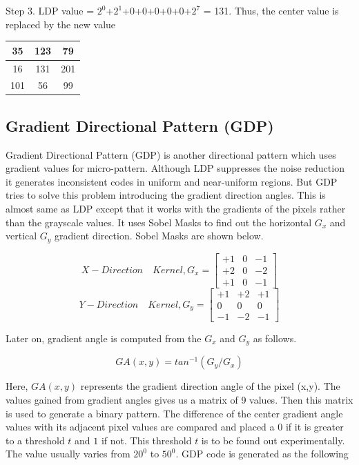 \documentclass[conference]{IEEEtran}
\begin{document}
Step 3. LDP value = $2^0$+$2^1$+0+0+0+0+0+$2^7$ = 131. Thus, the center value is replaced by the new value

\begin{center}
	\begin{tabular}{|c|c|c|}
		\hline
		35 & 123 & 79 \\
		\hline
		16 & 131 & 201 \\
		\hline
		101 & 56 & 99 \\
		\hline
	\end{tabular}
\end{center}

\subsection{Gradient Directional Pattern (GDP)}
Gradient Directional Pattern (GDP) \cite{2012GDP} is another directional pattern which uses gradient values for micro-pattern. Although LDP \cite{2010LDP} suppresses the noise reduction it generates inconsistent codes in uniform and near-uniform regions. But GDP tries to solve this problem introducing the gradient direction angles. This is almost same as LDP except that it works with the gradients of the pixels rather than the grayscale values. It uses Sobel Masks to find out the horizontal $G_x$ and vertical $G_y$ gradient direction. Sobel Masks are shown below.

\begin{center}
	\[
	X - Direction\quad Kernel, G_x = 
	\begin{bmatrix}
	+1 & 0 & -1 \\
	+2 & 0 & -2 \\
	+1 & 0 & -1
	\end{bmatrix}
	\]
	\[
	Y - Direction\quad Kernel, G_y = 
	\begin{bmatrix}
	+1 & +2 & +1 \\
	0 & 0 & 0 \\
	-1 & -2 & -1
	\end{bmatrix}
	\]
\end{center}


Later on, gradient angle is computed from the $G_x$ and $G_y$ as follows.

\begin{equation}
 GA (x,y) = tan^{-1}(G_y/G_x)
\end{equation}

Here, $GA (x,y)$ represents the gradient direction angle of the pixel (x,y). The values gained from gradient angles gives us a matrix of 9 values. Then this matrix is used to generate a binary pattern. The difference of the center gradient angle values with its adjacent pixel values are compared and placed a $0$ if it is greater to a threshold $t$ and $1$ if not. This threshold $t$ is to be found out experimentally. The value usually varies from $20^0$ to $50^0$. GDP code is generated as the following
\end{document}
